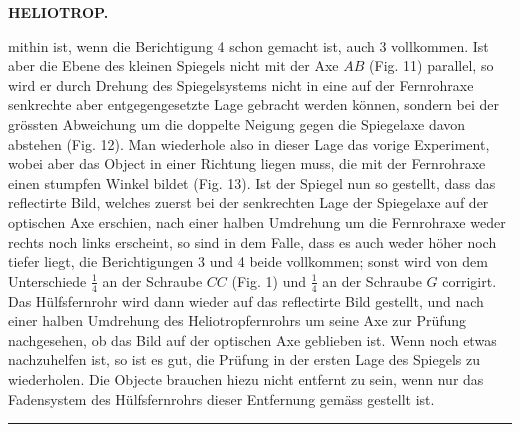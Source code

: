 \par\clearpage
\noindent{}\hfill{\small\textbf{HELIOTROP.}}\hfill\null\par\medskip
\noindent mithin ist, wenn die Berichtigung 4 schon gemacht ist, auch 3 vollkommen. Ist aber die Ebene des kleinen Spiegels nicht mit der Axe $AB$ (Fig. 11) parallel, so wird er durch Drehung des Spiegelsystems nicht in eine auf der Fernrohraxe senkrechte aber entgegengesetzte Lage gebracht werden können, sondern bei der grössten Abweichung um die doppelte Neigung gegen die Spiegelaxe davon abstehen (Fig. 12). Man wiederhole also in dieser Lage das vorige Experiment, wobei aber das Object in einer Richtung liegen muss, die mit der Fernrohraxe einen stumpfen Winkel bildet (Fig. 13). Ist der Spiegel nun so gestellt, dass das reflectirte Bild, welches zuerst bei der senkrechten Lage der Spiegelaxe auf der optischen Axe erschien, nach einer halben Umdrehung um die Fernrohraxe weder rechts noch links erscheint, so sind in dem Falle, dass es auch weder höher noch tiefer liegt, die Berichtigungen 3 und 4 beide vollkommen; sonst wird von dem Unterschiede $\frac14$ an der Schraube $CC$ (Fig. 1) und $\frac14$ an der Schraube $G$ corrigirt. Das Hülfsfernrohr wird dann wieder auf das reflectirte Bild gestellt, und nach einer halben Umdrehung des Heliotropfernrohrs um seine Axe zur Prüfung nachgesehen, ob das Bild auf der optischen Axe geblieben ist. Wenn noch etwas nachzuhelfen ist, so ist es gut, die Prüfung in der ersten Lage des Spiegels zu wiederholen. Die Objecte brauchen hiezu nicht entfernt zu sein, wenn nur das Fadensystem des Hülfsfernrohrs dieser Entfernung gemäss gestellt ist.
\par\vspace{2.5cm}\begin{center}\rule{3.5cm}{.4pt}\end{center}

